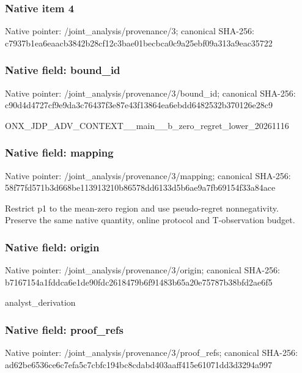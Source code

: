 \documentclass[10pt,a4paper]{article}
\begin{document}
\subsubsection{Native item 4}
Native pointer: /joint\_\allowbreak{}analysis/provenance/3; canonical SHA-256: c7937b1ea6eaacb3842b28cf12c3bae01becbca0c9a25ebf09a313a9eac35722

\subsubsection{Native field: bound\_\allowbreak{}id}
Native pointer: /joint\_\allowbreak{}analysis/provenance/3/bound\_\allowbreak{}id; canonical SHA-256: c90d4d4727cf9e9da3c76437f3e87e43f13864ea6ebdd6482532b370126e28c9

\begingroup\raggedright\sloppy ONX\_\allowbreak{}JDP\_\allowbreak{}ADV\_\allowbreak{}CONTEXT\_\allowbreak{}\_\allowbreak{}main\_\allowbreak{}\_\allowbreak{}b\_\allowbreak{}zero\_\allowbreak{}regret\_\allowbreak{}lower\_\allowbreak{}20261116\par\endgroup

\subsubsection{Native field: mapping}
Native pointer: /joint\_\allowbreak{}analysis/provenance/3/mapping; canonical SHA-256: 58f77fd571b3d668be113913210b86578dd6133d5b6ae9a7fb69154f33a84ace

\begingroup\raggedright\sloppy Restrict p1 to the mean-zero region and use pseudo-regret nonnegativity. Preserve the same native quantity,\allowbreak{} online protocol and T-observation budget.\par\endgroup

\subsubsection{Native field: origin}
Native pointer: /joint\_\allowbreak{}analysis/provenance/3/origin; canonical SHA-256: b7167154a1fddca6e1de90fdc2618479b6f91483b65a20e75787b38bfd2ae6f5

\begingroup\raggedright\sloppy analyst\_\allowbreak{}derivation\par\endgroup

\subsubsection{Native field: proof\_\allowbreak{}refs}
Native pointer: /joint\_\allowbreak{}analysis/provenance/3/proof\_\allowbreak{}refs; canonical SHA-256: ad62be6536ce6c7efa5c7cbfc194bc8cdabd403aaff415e61071dd3d3294a997
\end{document}
